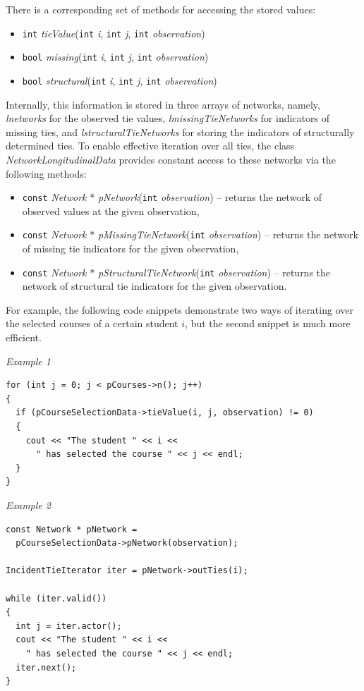 \documentclass[12pt]{article}
\renewcommand{\=}{\,=\,}
\newcommand{\+}{\,+\,}
\newcommand{\nnm}[1]{\textsf{\small\textit{#1}}}
\begin{document}
There is a corresponding set of methods for accessing the stored values:
\begin{itemize}
\item \verb|int| \nnm{tieValue}(\verb|int| \nnm{i}, \verb|int| \nnm{j},
\verb|int| \nnm{observation})
\item \verb|bool| \nnm{missing}(\verb|int| \nnm{i}, \verb|int| \nnm{j},
\verb|int| \nnm{observation})
\item \verb|bool| \nnm{structural}(\verb|int| \nnm{i}, \verb|int| \nnm{j},
\verb|int| \nnm{observation})
\end{itemize}

Internally, this information is stored in three arrays of networks, namely,
\nnm{lnetworks} for the observed tie values, \nnm{lmissingTieNetworks} for
indicators of missing ties, and \nnm{lstructuralTieNetworks} for storing the
indicators of structurally determined ties. To enable effective iteration over
all ties, the class \nnm{NetworkLongitudinalData} provides constant access to
these networks via the following methods:
\begin{itemize}
\item \verb|const| \nnm{Network} * \nnm{pNetwork}(\verb|int| \nnm{observation})
-- returns the network of observed values at the given observation,
\item \verb|const| \nnm{Network} *
\nnm{pMissingTieNetwork}(\verb|int| \nnm{observation}) -- returns the network of
missing tie indicators for the given observation,
\item \verb|const| \nnm{Network} *
\nnm{pStructuralTieNetwork}(\verb|int| \nnm{observation}) -- returns the network
of structural tie indicators for the given observation.
\end{itemize}

For example, the following code snippets demonstrate two ways of iterating over
the selected courses of a certain student $i$, but the second snippet is much
more efficient.

\emph{Example 1}
\begin{verbatim}
for (int j = 0; j < pCourses->n(); j++)
{
  if (pCourseSelectionData->tieValue(i, j, observation) != 0)
  {
    cout << "The student " << i <<
      " has selected the course " << j << endl;
  }
}
\end{verbatim}

\emph{Example 2}
\begin{verbatim}
const Network * pNetwork =
  pCourseSelectionData->pNetwork(observation);

IncidentTieIterator iter = pNetwork->outTies(i);

while (iter.valid())
{
  int j = iter.actor();
  cout << "The student " << i <<
    " has selected the course " << j << endl;
  iter.next();
}
\end{verbatim}
\end{document}
